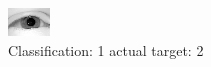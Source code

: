 \begin{figure}[h!]
\begin{center}
\includegraphics[width=0.60\columnwidth]{figures/ID2310_class_1_target_2.png}
\end{center}
\caption{ Classification: 1 actual target: 2}
\label{fig:ID2310_class_1_target_2}
\end{figure}
